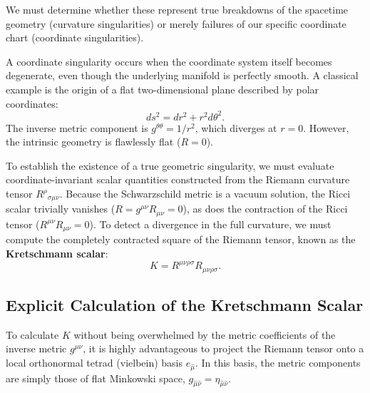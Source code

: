 \documentclass[11pt, a4paper]{report}
\begin{document}
We must determine whether these represent true breakdowns of the spacetime geometry (curvature singularities) or merely failures of our specific coordinate chart (coordinate singularities). 

A coordinate singularity occurs when the coordinate system itself becomes degenerate, even though the underlying manifold is perfectly smooth. A classical example is the origin of a flat two-dimensional plane described by polar coordinates:
\begin{equation}
ds^{2} = dr^{2} + r^{2}d\theta^{2}.
\end{equation}
The inverse metric component is $g^{\theta\theta} = 1/r^{2}$, which diverges at $r=0$. However, the intrinsic geometry is flawlessly flat ($R = 0$). 

To establish the existence of a true geometric singularity, we must evaluate coordinate-invariant scalar quantities constructed from the Riemann curvature tensor ${R^{\rho}}_{\sigma\mu\nu}$. Because the Schwarzschild metric is a vacuum solution, the Ricci scalar trivially vanishes ($R = g^{\mu\nu}R_{\mu\nu} = 0$), as does the contraction of the Ricci tensor ($R^{\mu\nu}R_{\mu\nu} = 0$). To detect a divergence in the full curvature, we must compute the completely contracted square of the Riemann tensor, known as the \textbf{Kretschmann scalar}:
\begin{equation}
K = R^{\mu\nu\rho\sigma}R_{\mu\nu\rho\sigma}.
\end{equation}

\subsection{Explicit Calculation of the Kretschmann Scalar}

To calculate $K$ without being overwhelmed by the metric coefficients of the inverse metric $g^{\mu\nu}$, it is highly advantageous to project the Riemann tensor onto a local orthonormal tetrad (vielbein) basis $e_{\hat{\mu}}$. In this basis, the metric components are simply those of flat Minkowski space, $g_{\hat{\mu}\hat{\nu}} = \eta_{\hat{\mu}\hat{\nu}}$.
\end{document}
